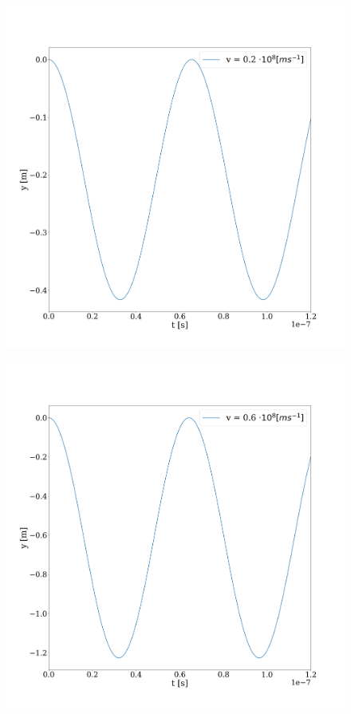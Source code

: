 \documentclass[journal]{IEEEtran}
\begin{document}
\begin{figure}
    \centering
    \includegraphics[width=\linewidth]{freq_rel_2.png}
\end{figure}

\begin{figure}
    \centering
    \includegraphics[width=\linewidth]{freq_rel_3.png}
\end{figure}
\end{document}
